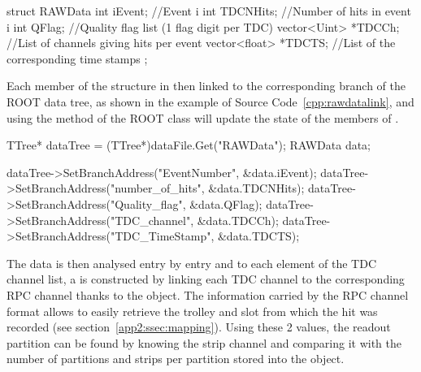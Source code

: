 	\begin{code}
    \begin{cppcode}
struct RAWData{
    int            iEvent;   //Event i
    int            TDCNHits; //Number of hits in event i
    int            QFlag;    //Quality flag list (1 flag digit per TDC)
    vector<Uint>  *TDCCh;    //List of channels giving hits per event
    vector<float> *TDCTS;    //List of the corresponding time stamps
};
    \end{cppcode}
	\label{cpp:rawdataoff}
	\vspace{5mm}
    \end{code}
    
    Each member of the structure in then linked to the corresponding branch of the ROOT data tree, as shown in the example of Source Code~\ref{cpp:rawdatalink}, and using the method  of the ROOT class  will update the state of the members of .\\
	
	\begin{code}
    \begin{cppcode}
TTree*  dataTree = (TTree*)dataFile.Get("RAWData");
RAWData data;

dataTree->SetBranchAddress("EventNumber",    &data.iEvent);
dataTree->SetBranchAddress("number_of_hits", &data.TDCNHits);
dataTree->SetBranchAddress("Quality_flag",   &data.QFlag);
dataTree->SetBranchAddress("TDC_channel",    &data.TDCCh);
dataTree->SetBranchAddress("TDC_TimeStamp",  &data.TDCTS);
    \end{cppcode}
	\label{cpp:rawdatalink}
	\vspace{5mm}
    \end{code}
    
    The data is then analysed entry by entry and to each element of the TDC channel list, a  is constructed by linking each TDC channel to the corresponding RPC channel thanks to the  object. The information carried by the RPC channel format allows to easily retrieve the trolley and slot from which the hit was recorded (see section~\ref{app2:ssec:mapping}). Using these 2 values, the readout partition can be found by knowing the strip channel and comparing it with the number of partitions and strips per partition stored into the  object.
    
